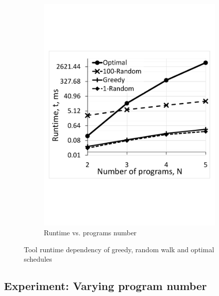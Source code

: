 \begin{figure}
\begin{subfigure}{0.42\textwidth}
        \includegraphics[width=1\linewidth]{figs/RuntimeVsPrograms.pdf}
        \caption{Runtime vs. programs number}
        \label{fig:RuntimeVsPrograms}
    \end{subfigure}
    \caption{Tool runtime dependency of greedy, random walk and optimal schedules}
\end{figure}




\subsection*{Experiment: Varying program number}
\label{sec:varyingPrograms}

